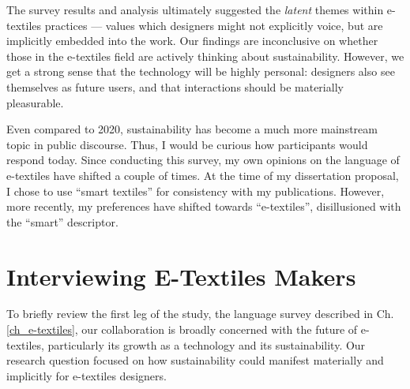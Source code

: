 The survey results and analysis ultimately suggested the \textit{latent} themes within e-textiles practices \cite{corbin_grounded_1990} --- values which designers might not explicitly voice, but are implicitly embedded into the work. Our findings are inconclusive on whether those in the e-textiles field are actively thinking about sustainability. However, we get a strong sense that the technology will be highly personal: designers also see themselves as future users, and that interactions should be materially pleasurable. 

Even compared to 2020, sustainability has become a much more mainstream topic in public discourse. Thus, I would be curious how participants would respond today.
Since conducting this survey, my own opinions on the language of e-textiles have shifted a couple of times. At the time of my dissertation proposal, I chose to use ``smart textiles'' for consistency with my publications. However, more recently, my preferences have shifted towards ``e-textiles'', disillusioned with the ``smart'' descriptor. 

\section{Interviewing E-Textiles Makers}

To briefly review the first leg of the study, the language survey described in Ch. \ref{ch_e-textiles}, our collaboration is broadly concerned with the future of e-textiles, particularly its growth as a technology and its sustainability. Our research question focused on how sustainability could manifest materially and implicitly for e-textiles designers. 


